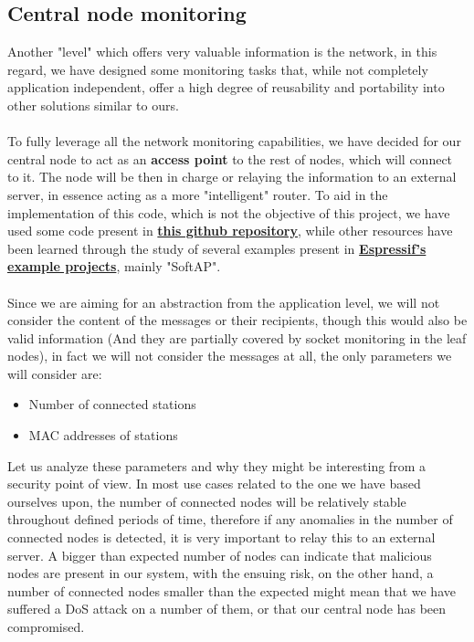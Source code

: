 \subsection{Central node monitoring} \label{sec:CentralNodeMonitoring}
Another "level" which offers very valuable information is the network, in this regard, we have designed some monitoring tasks that, while not completely application independent, offer a high degree of reusability and portability into other solutions similar to ours.
\\~\\
To fully leverage all the network monitoring capabilities, we have decided for our central node to act as an \textbf{access point} to the rest of nodes, which will connect to it. The node will be then in charge or relaying the information to an external server, in essence acting as a more "intelligent" router. To aid in the implementation of this code, which is not the objective of this project, we have used some code present in \href{https://github.com/martin-ger/esp32_nat_router}{\textbf{this github repository}}, while other resources have been learned through the study of several examples present in \href{https://github.com/espressif/esp-idf/tree/master/examples}{\textbf{Espressif's example projects}}, mainly "SoftAP".
\\~\\
Since we are aiming for an abstraction from the application level, we will not consider the content of the messages or their recipients, though this would also be valid information (And they are partially covered by socket monitoring in the leaf nodes), in fact we will not consider the messages at all, the only parameters we will consider are:

\begin{itemize}
    \item Number of connected stations
    \item MAC addresses of stations
\end{itemize}


Let us analyze these parameters and why they might be interesting from a security point of view. In most use cases related to the one we have based ourselves upon, the number of connected nodes will be relatively stable throughout defined periods of time, therefore if any anomalies in the number of connected nodes is detected, it is very important to relay this to an external server. A bigger than expected number of nodes can indicate that malicious nodes are present in our system, with the ensuing risk, on the other hand, a number of connected nodes smaller than the expected might mean that we have suffered a DoS attack on a number of them, or that our central node has been compromised.\\~\\

